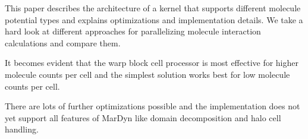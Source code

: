 This paper describes the architecture of a \cuda{} kernel that supports different molecule potential types and explains optimizations and implementation details.
We take a hard look at different approaches for parallelizing molecule interaction calculations and compare them.

It becomes evident that the warp block cell processor is most effective for higher molecule counts per cell and the simplest solution works best for low molecule counts per cell.

There are lots of further optimizations possible and the \cuda{} implementation does not yet support all features of MarDyn like domain decomposition and halo cell handling.